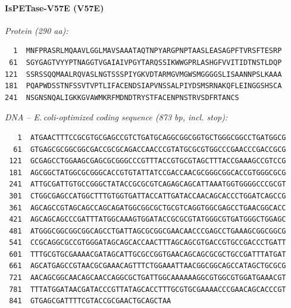 \documentclass[11pt]{article}
\begin{document}
\paragraph{IsPETase-V57E  (V57E)}
\noindent\textit{Protein (290 aa):}
\begin{verbatim}
  1  MNFPRASRLMQAAVLGGLMAVSAAATAQTNPYARGPNPTAASLEASAGPFTVRSFTESRP
 61  SGYGAGTVYYPTNAGGTVGAIAIVPGYTARQSSIKWWGPRLASHGFVVITIDTNSTLDQP
121  SSRSSQQMAALRQVASLNGTSSSPIYGKVDTARMGVMGWSMGGGGSLISAANNPSLKAAA
181  PQAPWDSSTNFSSVTVPTLIFACENDSIAPVNSSALPIYDSMSRNAKQFLEINGGSHSCA
241  NSGNSNQALIGKKGVAWMKRFMDNDTRYSTFACENPNSTRVSDFRTANCS
\end{verbatim}
\medskip
\noindent\textit{DNA -- E.\,coli-optimized coding sequence (873 bp, incl. stop):}
\begin{verbatim}
   1  ATGAACTTTCCGCGTGCGAGCCGTCTGATGCAGGCGGCGGTGCTGGGCGGCCTGATGGCG
  61  GTGAGCGCGGCGGCGACCGCGCAGACCAACCCGTATGCGCGTGGCCCGAACCCGACCGCG
 121  GCGAGCCTGGAAGCGAGCGCGGGCCCGTTTACCGTGCGTAGCTTTACCGAAAGCCGTCCG
 181  AGCGGCTATGGCGCGGGCACCGTGTATTATCCGACCAACGCGGGCGGCACCGTGGGCGCG
 241  ATTGCGATTGTGCCGGGCTATACCGCGCGTCAGAGCAGCATTAAATGGTGGGGCCCGCGT
 301  CTGGCGAGCCATGGCTTTGTGGTGATTACCATTGATACCAACAGCACCCTGGATCAGCCG
 361  AGCAGCCGTAGCAGCCAGCAGATGGCGGCGCTGCGTCAGGTGGCGAGCCTGAACGGCACC
 421  AGCAGCAGCCCGATTTATGGCAAAGTGGATACCGCGCGTATGGGCGTGATGGGCTGGAGC
 481  ATGGGCGGCGGCGGCAGCCTGATTAGCGCGGCGAACAACCCGAGCCTGAAAGCGGCGGCG
 541  CCGCAGGCGCCGTGGGATAGCAGCACCAACTTTAGCAGCGTGACCGTGCCGACCCTGATT
 601  TTTGCGTGCGAAAACGATAGCATTGCGCCGGTGAACAGCAGCGCGCTGCCGATTTATGAT
 661  AGCATGAGCCGTAACGCGAAACAGTTTCTGGAAATTAACGGCGGCAGCCATAGCTGCGCG
 721  AACAGCGGCAACAGCAACCAGGCGCTGATTGGCAAAAAAGGCGTGGCGTGGATGAAACGT
 781  TTTATGGATAACGATACCCGTTATAGCACCTTTGCGTGCGAAAACCCGAACAGCACCCGT
 841  GTGAGCGATTTTCGTACCGCGAACTGCAGCTAA
\end{verbatim}
\bigskip
\end{document}
